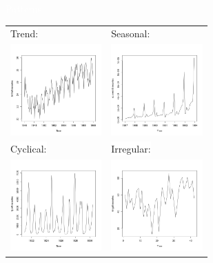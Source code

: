 \documentclass{beamer}
\begin{document}
{
\begin{frame}{\textcolor{white}{Patterns}}
\centering
\begin{tabular}{ll}
\colorbox{white}{Trend:} %
& \colorbox{white}{Seasonal:} \\ %
\includegraphics[width=3.5cm]{birthstimeseries} & \includegraphics[width=3.5cm]{souvenirtimeseries} \\ %
\colorbox{white}{Cyclical:} & \colorbox{white}{Irregular:} \\ 
\includegraphics[width=3.5cm]{lynxtimeseries} & \includegraphics[width=3.5cm]{kingstimeseries} \\ %
\end{tabular}
\end{frame}}
\end{document}
